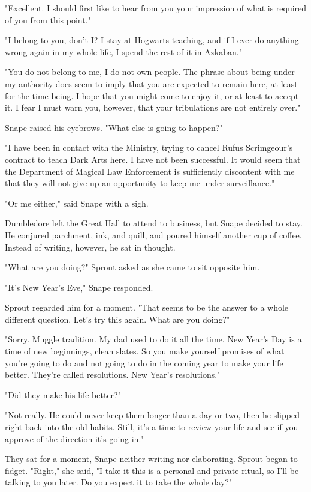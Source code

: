 "Excellent. I should first like to hear from you your impression of what is required of you from this point."

"I belong to you, don't I? I stay at Hogwarts teaching, and if I ever do anything wrong again in my whole life, I spend the rest of it in Azkaban."

"You do not belong to me, I do not own people. The phrase about being under my authority does seem to imply that you are expected to remain here, at least for the time being. I hope that you might come to enjoy it, or at least to accept it. I fear I must warn you, however, that your tribulations are not entirely over."

Snape raised his eyebrows. "What else is going to happen?"

"I have been in contact with the Ministry, trying to cancel Rufus Scrimgeour's contract to teach Dark Arts here. I have not been successful. It would seem that the Department of Magical Law Enforcement is sufficiently discontent with me that they will not give up an opportunity to keep me under surveillance."

"Or me either," said Snape with a sigh.

Dumbledore left the Great Hall to attend to business, but Snape decided to stay. He conjured parchment, ink, and quill, and poured himself another cup of coffee. Instead of writing, however, he sat in thought.

"What are you doing?" Sprout asked as she came to sit opposite him.

"It's New Year's Eve," Snape responded.

Sprout regarded him for a moment. "That seems to be the answer to a whole different question. Let's try this again. What are you doing?"

"Sorry. Muggle tradition. My dad used to do it all the time. New Year's Day is a time of new beginnings, clean slates. So you make yourself promises of what you're going to do and not going to do in the coming year to make your life better. They're called resolutions. New Year's resolutions."

"Did they make his life better?"

"Not really. He could never keep them longer than a day or two, then he slipped right back into the old habits. Still, it's a time to review your life and see if you approve of the direction it's going in."

They sat for a moment, Snape neither writing nor elaborating. Sprout began to fidget. "Right," she said, "I take it this is a personal and private ritual, so I'll be talking to you later. Do you expect it to take the whole day?"

